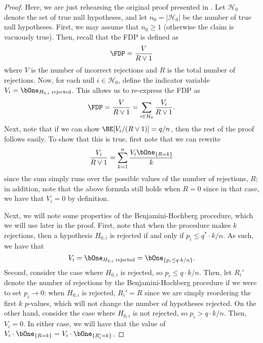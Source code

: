 \documentclass[11pt,reqno]{report}
\theoremstyle{definition}
\numberwithin{equation}{section}
\begin{document}
\begin{proof}
Here, we are just rehearsing the original proof presented in \cite{stat300}. Let $\mathcal{H}_0$ denote the set of true null hypotheses, and let $n_0 = |\mathcal{H}_0|$ be the number of true null hypotheses.  First, we may assume that $n_0 \geq 1$ (otherwise the claim is vacuously true). Then, recall that the FDP is defined as 
\[ \FDP = \frac{V}{R \vee 1} \] where $V$ is the number of incorrect rejections and $R$ is the total number of rejections. Now, for each null $i \in \mathcal{H}_0$, define the indicator variable $V_i = \bOne_{H_{0, i} \text{ rejected}}$. This allows us to re-express the FDP as
\[ \FDP = \frac{V}{R \vee 1} = \sum_{i \in \mathcal{H}_0} \frac{V_i}{R \vee 1}. \] 
Next, note that if we can show $\BE[ {V_i}/{(R \vee 1)}] = q / n$, then the rest of the proof follows easily. To show that this is true, first note that we can rewrite
\begin{equation}
\frac{V_i}{R \vee 1} = \sum_{k=1}^n \frac{V_i \bOne_{\{R = k\}}}{k}
\end{equation}
since the sum simply runs over the possible values of the number of rejections, $R$; in addition, note that the above formula still holds when $R = 0$ since in that case, we have that $V_i = 0$ by definition.

Next, we will note some properties of the Benjamini-Hochberg procedure, which we will use later in the proof. First, note that when the procedure makes $k$ rejections, then a hypothesis $H_{0, i}$ is rejected if and only if $p_i \leq q^* \cdot k / n$. As such, we have that
\begin{equation}
V_i =  \bOne_{H_{0, i} \text{ rejected}} = \bOne_{\{ p_i \leq q \cdot k / n \}}.
\end{equation}
Second, consider the case where $H_{0,i}$ is rejected, so $p_i \leq q \cdot k / n$. Then, let $R_i'$ denote the number of rejections by the Benjamini-Hochberg procedure if we were to set $p_i \to 0$: when $H_{0, i}$ is rejected, $R_i' = R$ since we are simply reordering the first $k$ $p$-values, which will not change the number of hypotheses rejected. On the other hand, consider the case where $H_{0,i}$ is not rejected, so $p_i > q \cdot k / n$. Then, $V_i = 0$. In either case, we will have that the value of $V_i \cdot \bOne_{\{R = k\}} = V_i \cdot \bOne_{\{ R_i' = k \}}$.


\end{proof}
\end{document}
